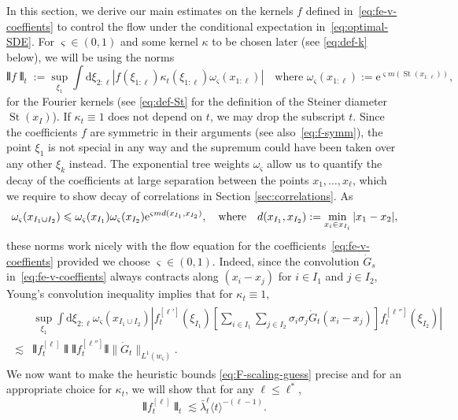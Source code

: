 \documentclass[11pt, a4paper]{scrartcl}
\numberwithin{equation}{section}
\theoremstyle{plain}
\theoremstyle{remark}
\newcommand{\assign}{:=}
\newcommand{\mathd}{\mathrm{d}}
\newcommand{\mathe}{\mathrm{e}}
\newcommand{\tmop}[1]{\ensuremath{\operatorname{#1}}}
\begin{document}
In this section, we derive our main estimates on the kernels $f$ defined
in~\eqref{eq:fe-v-coeffients} to control the flow under the conditional
expectation in~\eqref{eq:optimal-SDE}. For $\varsigma \in (0, 1)$ and some
kernel $\kappa$ to be chosen later (see \eqref{eq:def-k} below), we will be using
the norms
\begin{equation}
	\interleave f \interleave_t \assign \sup_{\xi_1}  \int \mathd \xi_{2 : \ell}
	| f (\xi_{1 : \ell}) \kappa_t (\xi_{1 : \ell}) \omega_{\varsigma} (x_{1 : \ell})
	|  \quad \text{where } \omega_{\varsigma} (x_{1 : \ell}) \assign
	\mathe^{\varsigma m (\tmop{St} (x_{1 : \ell}))}, \label{eq:def-exp-St}
\end{equation}
for the Fourier kernels (see \eqref{eq:def-St} for the definition of the
Steiner diameter $\tmop{St} (x_I)$). If $\kappa_t \equiv 1$ does not depend on $t$,
we may drop the subscript $t$. Since the coefficients $f$ are symmetric in
their arguments (see also~\eqref{eq:f-symm}), the point $\xi_1$ is not special in any way
and the supremum could have been taken over any other $\xi_k$ instead. The
exponential tree weights $\omega_{\varsigma}$ allow us to quantify the decay
of the coefficients at large separation between the points $x_1, \ldots,
	x_{\ell}$, which we require to show decay of correlations in Section
\ref{sec:correlations}. As
\[ \omega_{\varsigma} (x_{I_1 \cup I_2}) \leqslant \omega_{\varsigma}
	(x_{I_1}) \omega_{\varsigma} (x_{I_2}) \mathe^{\varsigma m d (x_{I_1},
		x_{I_2})}, \quad \text{where\quad} d (x_{I_1}, x_{I_2}) \assign \min_{x_i
		\in x_{I_i}} | x_1 - x_2 |, \]
these norms work nicely with the flow equation for the
coefficients~\eqref{eq:fe-v-coeffients} provided we choose $\varsigma \in (0,
	1)$. Indeed, since the convolution $\dot{G}_s$ in~\eqref{eq:fe-v-coeffients}
always contracts along $(x_i - x_j)$ for $i \in I_1$ and $j \in I_2$, Young's
convolution inequality implies that for $\kappa_t \equiv 1$,
\begin{align}
	\begin{split}
		         & \sup_{\xi_1}  \int \mathd \xi_{2 : \ell} \omega_{\varsigma} (x_{I_1 \cup
			I_2}) \left| f^{[\ell']}_t (\xi_{I_1}) \left[ \sum_{i \in I_1} \sum_{j \in
				I_2} \sigma_i \sigma_j  \dot{G}_t (x_i - x_j) \right] f^{[\ell'']}_t
		(\xi_{I_2}) \right|                                                                 \\
		\lesssim & \interleave f_t^{[\ell]} \interleave
		\interleave f_t^{[\ell'']} \interleave  \| \dot{G}_t \|_{L^1
				(w_{\varsigma})} . \label{eq:fe-young-ineq}
	\end{split}
\end{align}
We now want to make the heuristic bounds \eqref{eq:F-scaling-guess} precise and for an appropriate choice
for $\kappa_t$, we will show that for any $\ell\leqslant \ell^\ast$,
\begin{equation}
	\interleave f_t^{[\ell]} \interleave_t
	\lesssim \bar{\lambda}_t^{\ell}\langle t\rangle^{-(\ell-1)}\label{eq:f-ell-all}.
\end{equation}
\end{document}
